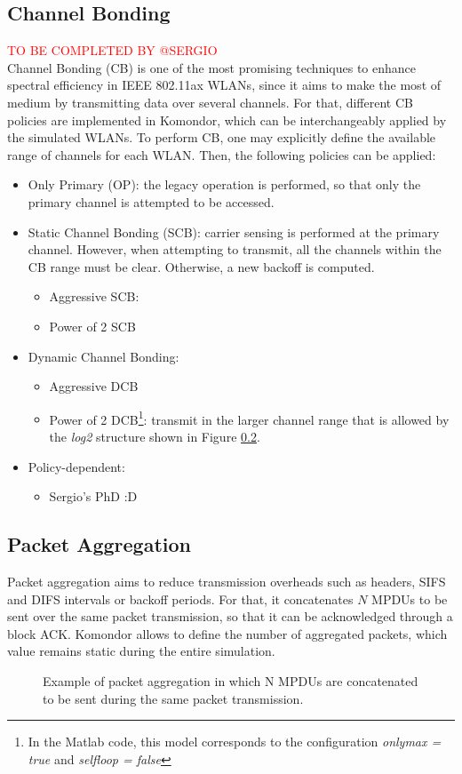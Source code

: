 \documentclass[a4paper]{article}
\begin{document}
	\subsection{Channel Bonding}
	\label{section:channel_bonding}
	\textcolor{red}{TO BE COMPLETED BY @SERGIO}\\
	Channel Bonding (CB) is one of the most promising techniques to enhance spectral efficiency in IEEE 802.11ax WLANs, since it aims to make the most of medium by transmitting data over several channels. For that, different CB policies are implemented in Komondor, which can be interchangeably applied by the simulated WLANs. To perform CB, one may explicitly define the available range of channels for each WLAN. Then, the following policies can be applied:
	\begin{itemize}
		\item Only Primary (OP): the legacy operation is performed, so that only the primary channel is attempted to be accessed.
		\item Static Channel Bonding (SCB): carrier sensing is performed at the primary channel. However, when attempting to transmit, all the channels within the CB range must be clear. Otherwise, a new backoff is computed.
		\begin{itemize}
			\item Aggressive SCB: 
			\item Power of 2 SCB
		\end{itemize}
		\item Dynamic Channel Bonding:
		\begin{itemize}
			\item Aggressive DCB
			\item Power of 2 DCB\footnote{In the Matlab code, this model corresponds to the configuration \textit{onlymax = true} and \textit{selfloop = false}}: transmit in the larger channel range that is allowed by the \textit{log2} structure shown in Figure \ref{}.  
		\end{itemize}
		\item Policy-dependent:
		\begin{itemize}
			\item Sergio's PhD :D
		\end{itemize}
	\end{itemize}

	\subsection{Packet Aggregation}
	Packet aggregation aims to reduce transmission overheads such as headers, SIFS and DIFS intervals or backoff periods. For that, it concatenates $N$ MPDUs to be sent over the same packet transmission, so that it can be acknowledged through a block ACK. Komondor allows to define the number of aggregated packets, which value remains static during the entire simulation.
	\begin{figure}[h!]
		\centering
		\caption{Example of packet aggregation in which N MPDUs are concatenated to be sent during the same packet transmission.}
		\label{fig:ampdu}
	\end{figure}
	
\end{document}
